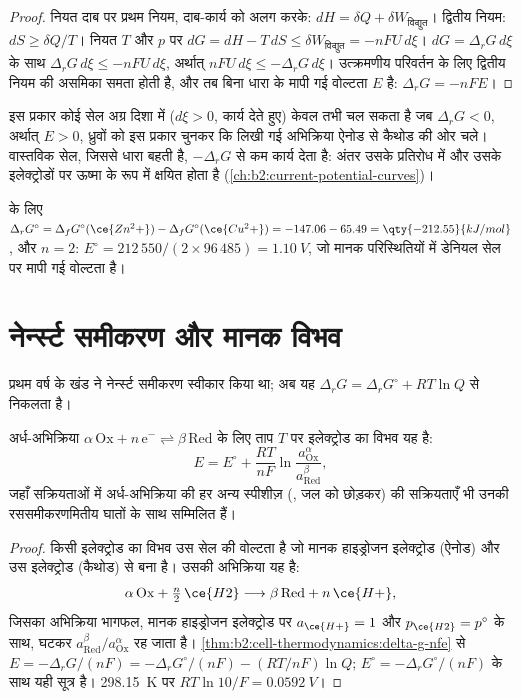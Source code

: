 \begin{proof}
नियत दाब पर प्रथम नियम, दाब-कार्य को अलग करके:
$dH = \delta Q + \delta W_{\text{विद्युत}}$। द्वितीय नियम: $dS \geq \delta Q/T$। नियत
$T$ और $p$ पर $dG = dH - T\,dS \leq \delta W_{\text{विद्युत}} = -nFU\,d\xi$।
$dG = \Delta_r G\,d\xi$ के साथ $\Delta_r G\,d\xi \leq -nFU\,d\xi$, अर्थात्
$nFU\,d\xi \leq -\Delta_r G\,d\xi$। उत्क्रमणीय परिवर्तन के लिए द्वितीय नियम की असमिका
समता होती है, और तब बिना धारा के मापी गई वोल्टता $E$ है:
$\Delta_r G = -nFE$।
\end{proof}

इस प्रकार कोई सेल अग्र दिशा में ($d\xi > 0$, कार्य देते हुए) केवल तभी चल सकता है जब $\Delta_r G <
0$, अर्थात् $E > 0$, ध्रुवों को इस प्रकार चुनकर कि लिखी गई अभिक्रिया
ऐनोड से कैथोड की ओर चले। वास्तविक सेल, जिससे धारा बहती है,
$-\Delta_r G$ से कम कार्य देता है: अंतर उसके प्रतिरोध में और
उसके इलेक्ट्रोडों पर ऊष्मा के रूप में क्षयित होता है (\cref{ch:b2:current-potential-curves})।

\begin{example}[डेनियल सेल]\label{ex:b2:cell-thermodynamics:daniell}
 के लिए $\Delta_r G^\circ = \Delta_f G^\circ(\ce{Zn^2+}) -
\Delta_f G^\circ(\ce{Cu^2+}) = -147.06 - 65.49 = \qty{-212.55}{kJ/mol}$, और $n = 2$:
$E^\circ = 212\,550/(2 \times 96\,485) = \qty{1.10}{V}$, जो मानक परिस्थितियों में
डेनियल सेल पर मापी गई वोल्टता है।
\end{example}

\section{नेर्न्स्ट समीकरण और मानक विभव}

प्रथम वर्ष के खंड ने नेर्न्स्ट समीकरण स्वीकार किया था; अब यह
$\Delta_r G = \Delta_r G^\circ + RT\ln Q$ से निकलता है।

\begin{theorem}[नेर्न्स्ट समीकरण, व्युत्पन्न]\label{thm:b2:cell-thermodynamics:nernst-derived}
अर्ध-अभिक्रिया $\alpha\,\mathrm{Ox} + n\,\mathrm e^- \rightleftharpoons
\beta\,\mathrm{Red}$ के लिए ताप $T$ पर इलेक्ट्रोड का विभव यह है:
\[
  E = E^\circ + \frac{RT}{nF}\ln\frac{a_{\mathrm{Ox}}^{\alpha}}{a_{\mathrm{Red}}^{\beta}} ,
\]
जहाँ सक्रियताओं में अर्ध-अभिक्रिया की हर अन्य स्पीशीज़ (, जल को
छोड़कर) की सक्रियताएँ भी उनकी रससमीकरणमितीय घातों के साथ सम्मिलित हैं।
\end{theorem}

\begin{proof}
किसी इलेक्ट्रोड का विभव उस सेल की वोल्टता है जो मानक
हाइड्रोजन इलेक्ट्रोड (ऐनोड) और उस इलेक्ट्रोड (कैथोड) से बना है। उसकी अभिक्रिया यह है:
\[
  \alpha\,\mathrm{Ox} + \tfrac n2\,\ce{H2} \longrightarrow \beta\,\mathrm{Red} + n\,\ce{H+} ,
\]
जिसका अभिक्रिया भागफल, मानक हाइड्रोजन इलेक्ट्रोड पर $a_{\ce{H+}} = 1$ और $p_{\ce{H2}} = p^\circ$
के साथ, घटकर $a_{\mathrm{Red}}^\beta/
a_{\mathrm{Ox}}^\alpha$ रह जाता है। \cref{thm:b2:cell-thermodynamics:delta-g-nfe} से
$E = -\Delta_r G/(nF) = -\Delta_r G^\circ/(nF) - (RT/nF)\ln Q$; $E^\circ =
-\Delta_r G^\circ/(nF)$ के साथ यही सूत्र है। \qty{298.15}{K} पर $RT\ln 10/F =
\qty{0.0592}{V}$।
\end{proof}

